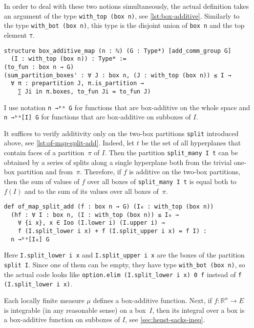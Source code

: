 \documentclass[a4paper, UKenglish,cleveref, autoref, thm-restate]{lipics-v2021}
\newcommand{\bbR}{\mathbb{R}}
\begin{document}
In order to deal with these two notions simultaneously, the actual
definition takes an argument of the type \lstinline=with_top (box n)=,
see \autoref{lst:box-additive}. Similarly to the type
\lstinline=with_bot (box n)=, this type is the disjoint union of
\lstinline=box n= and the top element \lstinline=⊤=.

\begin{lstlisting}[caption={Definition of a box-additive map},label=lst:box-additive]
structure box_additive_map (n : ℕ) (G : Type*) [add_comm_group G]
  (I : with_top (box n)) : Type* :=
(to_fun : box n → G)
(sum_partition_boxes' : ∀ J : box n, (J : with_top (box n)) ≤ I →
  ∀ π : prepartition J, π.is_partition →
    ∑ Ji in π.boxes, to_fun Ji = to_fun J)
\end{lstlisting}

I use notation \lstinline=n →ᵇᵃ G= for functions that are box-additive
on the whole space and \lstinline=n →ᵇᵃ[I] G= for functions that are
box-additive on subboxes of \(I\).

It suffices to verify additivity only on the two-box partitions
\lstinline=split= introduced above, see
\autoref{lst:of-map-split-add}. Indeed, let \(t\) be the set of all
hyperplanes that contain faces of a partition~\(\pi\) of \(I\). Then
the partition \lstinline=split_many I t= can be obtained by a series
of splits along a single hyperplane both from the trivial one-box
partition and from~\(\pi\). Therefore, if \(f\) is additive on the
two-box partitions, then the sum of values of \(f\) over all boxes of
\lstinline=split_many I t= is equal both to \(f(I)\) and to the sum of
its values over all boxes of~\(\pi\).

\begin{lstlisting}[caption={A map additive on splits by a hyperplane is a box-additive map},label=lst:of-map-split-add]
def of_map_split_add (f : box n → G) (I₀ : with_top (box n))
  (hf : ∀ I : box n, (I : with_top (box n)) ≤ I₀ →
    ∀ {i x}, x ∈ Ioo (I.lower i) (I.upper i) →
    f (I.split_lower i x) + f (I.split_upper i x) = f I) :
  n →ᵇᵃ[I₀] G
\end{lstlisting}

Here \lstinline=I.split_lower i x= and \lstinline=I.split_upper i x=
are the boxes of the partition \lstinline=split I=. Since one of them
can be empty, they have type \lstinline=with_bot (box n)=, so the
actual code looks like \lstinline=option.elim (I.split_lower i x) 0 f=
instead of \lstinline=f (I.split_lower i x)=.

Each locally finite measure \(\mu\) defines a box-additive function.
Next, if \(f\colon\bbR^{n}\to E\) is integrable (in any reasonable
sense) on a box~\(I\), then its integral over a box is a box-additive
function on subboxes of \(I\), see \autoref{sec:henst-sacks-ineq}.
\end{document}
